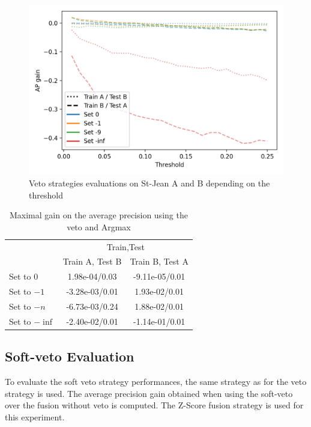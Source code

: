 \begin{figure}
  \caption{Veto strategies evaluations on St-Jean A and B depending on the threshold}
  \label{fig:veto}
  \includegraphics[width=\linewidth]{img/veto.png}
\end{figure}

\begin{table}
  \centering
  \caption{Maximal gain on the average precision using the veto and Argmax}
  \label{tab:veto}
  \begin{tabular}{l c c}
    \toprule
                   & \multicolumn{2}{c}{Train,Test} \\
                   & Train A, Test B & Train B, Test A \\
    \midrule
    Set to $0$     & 1.98e-04/0.03  & -9.11e-05/0.01 \\
    Set to $-1$    & -3.28e-03/0.01 & 1.93e-02/0.01 \\
    Set to $-n$    & -6.73e-03/0.24 & 1.88e-02/0.01 \\
    Set to $-\inf$ & -2.40e-02/0.01 & -1.14e-01/0.01 \\
    \bottomrule
  \end{tabular}
\end{table}

\subsection{Soft-veto Evaluation}

To evaluate the soft veto strategy performances, the same strategy as for the veto strategy is used.
The average precision gain obtained when using the soft-veto over the fusion without veto is computed.
The Z-Score fusion strategy is used for this experiment.

